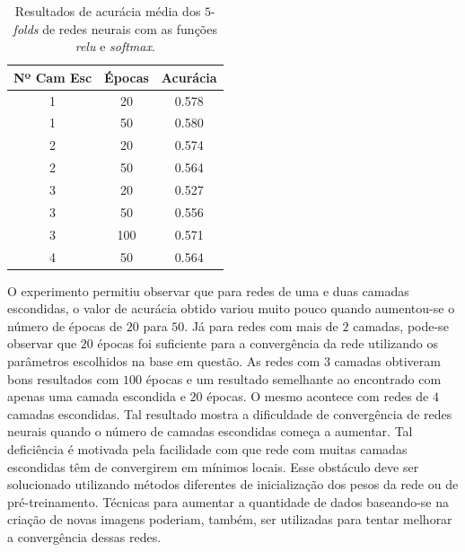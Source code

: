 \documentclass[conference]{IEEEtran}
\begin{document}
\begin{table}[h!]
	\centering
	
	\begin{tabular}{ccc} \toprule
	\textbf{Nº Cam Esc} & \textbf{Épocas} & \textbf{Acurácia}    \\ \toprule 	
	1                              & 20              & 0.578                \\
	1                              & 50              & 0.580   				\\
	2                              & 20              & 0.574                \\
	2                              & 50              & 0.564                \\
	3                              & 20              & 0.527                \\
	3                              & 50              & 0.556                \\
	3                              & 100             & 0.571                \\
	4                              & 50              & 0.564                \\
	\bottomrule      
	\end{tabular}
	\caption{\small Resultados de acurácia média dos $5$-\emph{folds} de redes neurais com as funções \emph{relu} e \emph{softmax}.}
	\label{tab:misc}
\end{table}

O experimento permitiu observar que para redes de uma e duas camadas escondidas, o valor de acurácia obtido variou muito pouco quando aumentou-se o número de épocas de $20$ para $50$. Já para redes com mais de $2$ camadas, pode-se observar que $20$ épocas foi suficiente para a convergência da rede utilizando os parâmetros escolhidos na base em questão. As redes com $3$ camadas obtiveram bons resultados com $100$ épocas e um resultado semelhante ao encontrado com apenas uma camada escondida e $20$ épocas. O mesmo acontece com redes de $4$ camadas escondidas. Tal resultado mostra a dificuldade de convergência de redes neurais quando o número de camadas escondidas começa a aumentar. Tal deficiência é motivada pela facilidade com que rede com muitas camadas escondidas têm de convergirem em mínimos locais. Esse obstáculo deve ser solucionado utilizando métodos diferentes de inicialização dos pesos da rede ou de pré-treinamento. Técnicas para aumentar a quantidade de dados baseando-se na criação de novas imagens poderiam, também, ser utilizadas para tentar melhorar a convergência dessas redes.
\end{document}
